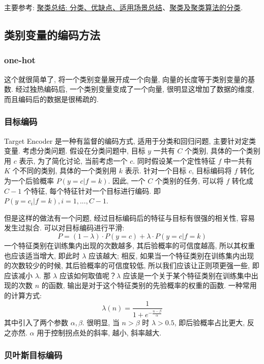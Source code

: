 主要参考: \href{https://blog.csdn.net/weixin_45440065/article/details/106358007}{聚类总结: 分类、优缺点、适用场景总结}、\href{https://blog.csdn.net/count_on_me/article/details/82193745}{聚类及聚类算法的分类}. 

\subsection{类别变量的编码方法}
\subsubsection{one-hot}
这个就很简单了, 将一个类别变量展开成一个向量, 向量的长度等于类别变量的基数. 经过独热编码后, 一个类别变量变成了一个向量, 很明显这增加了数据的维度, 而且编码后的数据是很稀疏的. 

\subsubsection{目标编码}
Target Encoder 是一种有监督的编码方式, 适用于分类和回归问题, 主要针对定类变量. 考虑分类问题. 假设在分类问题中, 目标 $y$  一共有 $C$ 个类别, 具体的一个类别用 $c$ 表示, 为了简化讨论, 当前考虑一个 $c$. 同时假设某一个定性特征 $f$ 中一共有 $K$ 个不同的类别, 具体的一个类别用 $k$ 表示. 针对一个目标 $c$, 目标编码将 $f$ 转化为一个后验概率 $P(y = c | f=k)$. 因此, 一个 $C$ 个类别的任务, 可以将 $f$ 转化成 $C-1$ 个特征, 每个特征针对一个目标进行编码. 即 $P(y=c_i | f=k), i=1, ..., C-1$. 

但是这样的做法有一个问题, 经过目标编码后的特征与目标有很强的相关性, 容易发生过拟合. 可以对目标编码进行平滑: 
$$
P = (1-\lambda) \cdot P(y = c) + \lambda \cdot P(y=c | f=k)
$$
一个特征类别在训练集内出现的次数越多, 其后验概率的可信度越高, 所以其权重也应该适当增大, 即此时 $\lambda$ 应该越大; 相反, 如果当一个特征类别在训练集内出现的次数较少的时候, 其后验概率的可信度较低, 所以我们应该让正则项更强一些, 即应该减小 $\lambda$. 那 $\lambda$ 应该如何取值呢？$\lambda$ 应该是一个关于某个特征类别在训练集中出现的次数 $n$ 的函数, 输出是对于这个特征类别的先验概率的权重的函数. 一种常用的计算方式: 
$$
\lambda (n) = \frac{1}{1+e^{-\frac{n-\beta}{\alpha}}}
$$
其中引入了两个参数 $\alpha, \beta$. 很明显, 当 $n > \beta$ 时 $\lambda > 0.5$, 即后验概率占比更大, 反之亦然. $\alpha$ 用于控制拐点处的斜率, 越小, 斜率越大.  

\subsubsection{贝叶斯目标编码}

